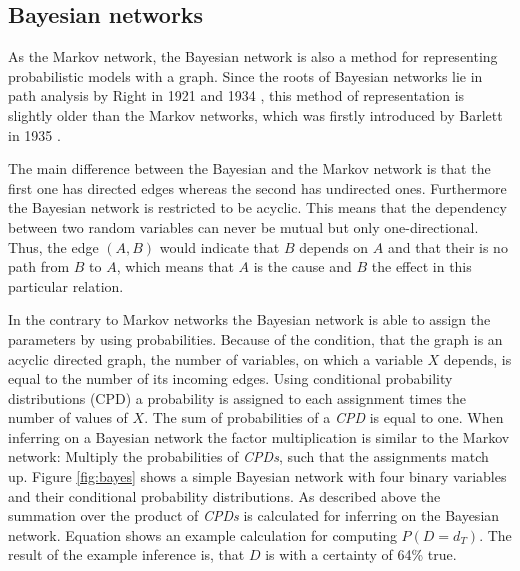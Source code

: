

\subsection{Bayesian networks} \label{sec:bayes}

As the Markov network, the Bayesian network is also a method for representing probabilistic models with a graph. Since the roots of Bayesian networks lie in path analysis by Right in 1921 \cite{wright1921correlation} and 1934 \cite{wright1934method}, this method of representation is slightly older than the Markov networks, which was firstly introduced by Barlett in 1935 \cite{bartlett1935contingency}.

The main difference between the Bayesian and the Markov network is that the first one has directed edges whereas the second has undirected ones. Furthermore the Bayesian network is restricted to be acyclic. This means that the dependency between two random variables can never be mutual but only one-directional. Thus, the edge $(A, B)$ would indicate that $B$ depends on $A$ and that their is no path from $B$ to $A$, which means that $A$ is the cause and $B$ the effect in this particular relation.

In the contrary to Markov networks the Bayesian network is able to assign the parameters by using probabilities. Because of the condition, that the graph is an acyclic directed graph, the number of variables, on which a variable $X$ depends, is equal to the number of its incoming edges. Using conditional probability distributions (CPD) a probability is assigned to each assignment times the number of values of $X$. The sum of probabilities of a \textit{CPD} is equal to one. When inferring on a Bayesian network the factor multiplication is similar to the Markov network: Multiply the probabilities of \textit{CPDs}, such that the assignments match up. Figure \ref{fig:bayes} shows a simple Bayesian network with four binary variables and their conditional probability distributions. As described above the summation over the product of \textit{CPDs} is calculated for inferring on the Bayesian network. Equation shows an example calculation for computing $P(D = d_T).$ The result of the example inference is, that $D$ is with a certainty of 64\% true.

